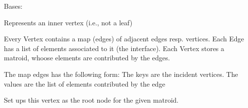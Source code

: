 \documentclass[letterpaper,12pt,english]{sphinxmanual}
\begin{document}

\begin{fulllineitems}
\label{\detokenize{api/modules:cbmpy.fluxmodules.decomposition.Vertex}}
\pysigstartsignatures
\pysigline
{}
\pysigstopsignatures
\sphinxAtStartPar
Bases: {\hyperref[\detokenize{api/modules:cbmpy.fluxmodules.decomposition.AbstractVertex}]{}}

\sphinxAtStartPar
Represents an inner vertex (i.e., not a leaf)

\sphinxAtStartPar
Every Vertex contains a map (edges) of adjacent edges resp. vertices.
Each Edge has a list of elements associated to it (the interface).
Each Vertex stores a matroid, whoose elements are contributed by the edges.

\sphinxAtStartPar
The map edges has the following form:
The keys are the incident vertices.
The values are the list of elements contributed by the edge

\begin{fulllineitems}
\label{\detokenize{api/modules:cbmpy.fluxmodules.decomposition.Vertex.__init__}}
\pysigstartsignatures
\pysiglinewithargsret
{}
{}
{}
\pysigstopsignatures
\end{fulllineitems}


\begin{fulllineitems}
\label{\detokenize{api/modules:cbmpy.fluxmodules.decomposition.Vertex.label}}
\pysigstartsignatures
\pysiglinewithargsret
{}
{}
{}
\pysigstopsignatures
\end{fulllineitems}


\begin{fulllineitems}
\label{\detokenize{api/modules:cbmpy.fluxmodules.decomposition.Vertex.setUpRoot}}
\pysigstartsignatures
\pysiglinewithargsret
{}
{}
{}
\pysigstopsignatures
\sphinxAtStartPar
Set ups this vertex as the root node for the given matroid.


\end{fulllineitems}
\end{fulllineitems}
\end{document}
